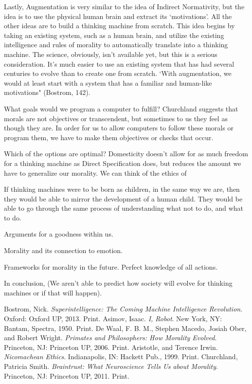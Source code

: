 \documentclass[11pt, oneside]{article}
\begin{document}
\par Lastly, Augmentation is very similar to the idea of Indirect Normativity, but the idea is to use the physical human brain and extract its `motivations'. All the other ideas are to build a thinking machine from scratch. This idea begins by taking an existing system, such as a human brain, and utilize the existing intelligence and rules of morality to automatically translate into a thinking machine. The science, obviously, isn't available yet, but this is a serious consideration. It's much easier to use an existing system that has had several centuries to evolve than to create one from scratch. `With augmentation, we would at least start with a system that has a familiar and human-like motivations" (Bostrom, 142). 

\par What goals would we program a computer to fulfill? Churchland suggests that morals are not objectives or transcendent, but sometimes to us they feel as though they are. In order for us to allow computers to follow these morals or program them, we have to make them objectives or checks that occur. 

\par Which of the options are optimal? Domesticity doesn't allow for as much freedom for a thinking machine as Direct Specification does, but reduces the amount we have to generalize our morality. We can think of the ethics of 

\par If thinking machines were to be born as children, in the same way we are, then they would be able to mirror the development of a human child. They would be able to go through the same process of understanding what not to do, and what to do. 

\par Arguments for a goodness within us. 

\par Morality and its connection to emotion.

\par Frameworks for morality in the future. Perfect knowledge of all actions. 

\par In conclusion, (We aren't able to predict how society will evolve for thinking machines or if that will happen).

\begin{thebibliography}{9}
  Bostrom, Nick. 
  \emph{Superintelligence: The Coming Machine Intelligence Revolution}.
  Oxford: Oxford UP, 2013. 
  Print.
  Asimov, Isaac.
  \emph{I, Robot}.
  New York, NY: Bantam, Spectra, 1950.
  Print.
  De Waal, F. B. M., Stephen Macedo, Josiah Ober, and Robert Wright.
  \emph{Primates and Philosophers: How Morality Evolved}.
  Princeton, NJ: Princeton UP, 2006.
  Print.
  Aristotle, and Terence Irwin.
  \emph{Nicomachean Ethics}.
  Indianapolis, IN: Hackett Pub., 1999.
  Print.
  Churchland, Patricia Smith.
  \emph{Braintrust: What Neuroscience Tells Us about Morality}.
  Princeton, NJ: Princeton UP, 2011. 
  Print.
\end{thebibliography}
\end{document}
